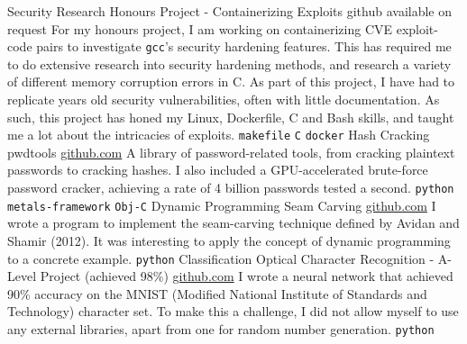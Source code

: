 \documentclass[9pt]{developercv} %
\begin{document}
\vspace{-20 pt}
\begin{entrylist}
 	\entry
		{Security Research}
		{Honours Project - Containerizing Exploits}
    {github available on request}
		{
      For my honours project, I am working on containerizing CVE exploit-code pairs to investigate \texttt{gcc}'s security hardening features.      This has required me to do extensive research into security hardening methods, and research a variety of different memory corruption errors in C. 
      As part of this project, I have had to replicate years old security vulnerabilities, often with little documentation. 
      As such, this project has honed my Linux, Dockerfile, C and Bash skills, and taught me a lot about the intricacies of exploits.
			\newline
      \texttt{makefile} \slashsep \texttt{C} \slashsep \texttt{docker}
		}  
    \entry
		{Hash Cracking}
		{pwdtools}
		{\href{https://github.com/JacobInwald/pwdtools}{github.com}}
		{
			A library of password-related tools, from cracking plaintext passwords to cracking hashes. 
			I also included a GPU-accelerated brute-force password cracker, achieving a rate of 4 billion passwords tested a second. 
			\newline
			\texttt{python} \slashsep \texttt{metals-framework} \slashsep \texttt{Obj-C}
		}
    \entry
		{Dynamic Programming}
		{Seam Carving}
		{\href{https://github.com/JacobInwald/Seam-Carving}{github.com}}
		{
			I wrote a program to implement the seam-carving technique defined by Avidan and Shamir (2012). 
		 	It was interesting to apply the concept of dynamic programming to a concrete example.
			 \newline
			 \texttt{python}
		}
    \entry
		{Classification}
		{Optical Character Recognition - A-Level Project (achieved 98\%)}
		{\href{https://github.com/JacobInwald/OCRAlgebra}{github.com}}
		{
			I wrote a neural network that achieved 90\% accuracy on the MNIST (Modified National Institute of Standards and Technology) character set. 
			To make this a challenge, I did not allow myself to use any external libraries, apart from one for random number generation.  
			\newline
			\texttt{python}
		}
\end{entrylist}
\end{document}
